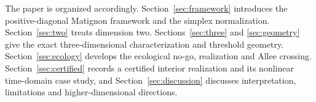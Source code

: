 The paper is organized accordingly. Section~\ref{sec:framework} introduces the positive-diagonal Matignon framework and the simplex normalization. Section~\ref{sec:two} treats dimension two. Sections~\ref{sec:three} and \ref{sec:geometry} give the exact three-dimensional characterization and threshold geometry. Section~\ref{sec:ecology} develops the ecological no-go, realization and Allee crossing. Section~\ref{sec:certified} records a certified interior realization and its nonlinear time-domain case study, and Section~\ref{sec:discussion} discusses interpretation, limitations and higher-dimensional directions.
